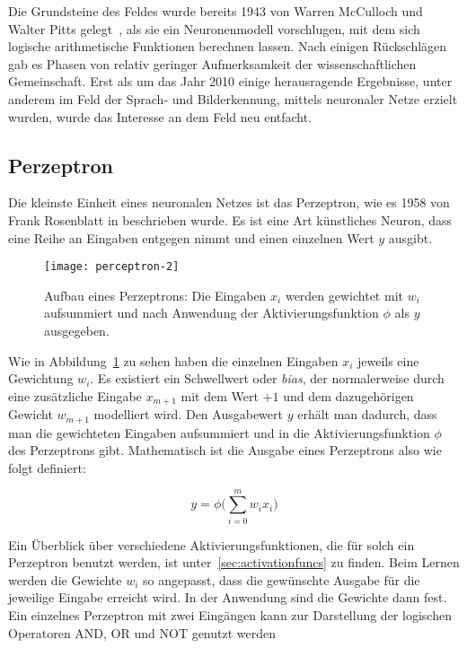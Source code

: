 Die Grundsteine des Feldes wurde bereits 1943 von Warren McCulloch und Walter Pitts gelegt~\cite{mcculloch1943logical}, 
als sie ein Neuronenmodell vorschlugen, mit dem sich logische arithmetische Funktionen berechnen lassen. 
Nach einigen Rückschlägen gab es Phasen von relativ geringer Aufmerksamkeit der wissenschaftlichen Gemeinschaft. 
Erst als um das Jahr 2010 einige herausragende Ergebnisse, unter anderem im Feld der Sprach- und Bilderkennung, 
mittels neuronaler Netze erzielt wurden, wurde das Interesse an dem Feld neu entfacht. 



\subsection{Perzeptron}
Die kleinste Einheit eines neuronalen Netzes ist das Perzeptron, wie es 1958 von Frank Rosenblatt in \cite{rosenblatt1958perceptron} beschrieben wurde.
Es ist eine Art künstliches Neuron, dass eine Reihe an Eingaben entgegen nimmt und einen einzelnen Wert \(y\) ausgibt.

\begin{figure}[h]
    \centering
	\texttt{[image: perceptron-2]}
	\caption[Schematischer Aufbau Perzeptron]{Aufbau eines Perzeptrons: Die Eingaben $x_i$ werden gewichtet mit $w_i$ aufsummiert und nach Anwendung der Aktivierungsfunktion $\phi$ als $y$ ausgegeben.}
	\label{fig:singleNeuron}
\end{figure}

Wie in Abbildung~\ref{fig:singleNeuron} zu sehen haben die einzelnen Eingaben \(x_i\) jeweils eine Gewichtung \(w_i\).
Es existiert ein Schwellwert oder \textit{bias}, der normalerweise 
durch eine zusätzliche Eingabe \(x_{m+1}\) mit dem Wert \(+1\) und dem dazugehörigen Gewicht \(w_{m+1}\) modelliert wird.
Den Ausgabewert \(y\) erhält man dadurch, dass man die gewichteten Eingaben aufsummiert und in die Aktivierungsfunktion \( \phi \) des Perzeptrons gibt.
Mathematisch ist die Ausgabe eines Perzeptrons also wie folgt definiert:

\begin{equation}
	y = \phi \Big( \sum_{i= 0}^{m} w_i x_i \Big)
\end{equation}

Ein Überblick über verschiedene Aktivierungsfunktionen, die für solch ein Perzeptron benutzt werden, ist unter~\ref{sec:activationfuncs} zu finden.
Beim Lernen werden die Gewichte \(w_i\) so angepasst, dass die gewünschte Ausgabe für die jeweilige Eingabe erreicht wird.
In der Anwendung sind die Gewichte dann fest.
Ein einzelnes Perzeptron mit zwei Eingängen kann zur Darstellung der logischen Operatoren AND, OR und NOT genutzt werden

